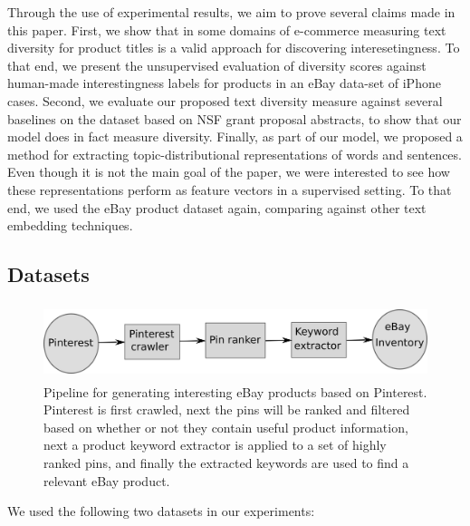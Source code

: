 Through the use of experimental results, we aim to prove several
claims made in this paper. First, we show that in some domains of
e-commerce measuring text diversity for product titles is a valid
approach for discovering interesetingness. To that end, we present the
unsupervised evaluation of diversity scores against human-made
interestingness labels for products in an eBay data-set of iPhone
cases. Second, we evaluate our proposed text diversity measure against
several baselines on the dataset based on NSF grant proposal
abstracts, to show that our model does in fact measure
diversity. Finally, as part of our model, we proposed a method for
extracting topic-distributional representations of words and
sentences. Even though it is not the main goal of the paper, we were
interested to see how these representations perform as feature vectors
in a supervised setting. To that end, we used the eBay product
dataset again, comparing against other text embedding techniques.

\subsection{Datasets}
\label{sec:datasets}


\begin{figure}
\begin{center}
\includegraphics[height=2.2cm]{figures/pinterest-pipeline.png}
\caption{Pipeline for generating interesting eBay products based on Pinterest. Pinterest is first crawled, next the pins will be ranked and filtered based on whether or not they contain useful product information, next a product keyword extractor is applied to a set of highly ranked pins, and finally the extracted keywords are used to find a relevant eBay product.}
\end{center}
\label{fig:pinterest-pipeline}
\end{figure}

We used the following two datasets in our experiments: 

